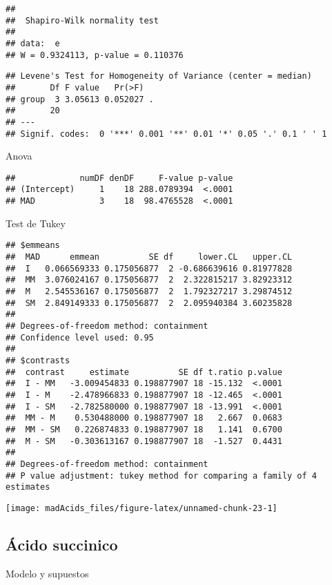 \documentclass[
]{article}
\begin{document}
\begin{verbatim}
## 
##  Shapiro-Wilk normality test
## 
## data:  e
## W = 0.9324113, p-value = 0.110376
\end{verbatim}

\begin{verbatim}
## Levene's Test for Homogeneity of Variance (center = median)
##       Df F value   Pr(>F)  
## group  3 3.05613 0.052027 .
##       20                   
## ---
## Signif. codes:  0 '***' 0.001 '**' 0.01 '*' 0.05 '.' 0.1 ' ' 1
\end{verbatim}

Anova

\begin{verbatim}
##             numDF denDF     F-value p-value
## (Intercept)     1    18 288.0789394  <.0001
## MAD             3    18  98.4765528  <.0001
\end{verbatim}

Test de Tukey

\begin{verbatim}
## $emmeans
##  MAD      emmean          SE df     lower.CL   upper.CL
##  I   0.066569333 0.175056877  2 -0.686639616 0.81977828
##  MM  3.076024167 0.175056877  2  2.322815217 3.82923312
##  M   2.545536167 0.175056877  2  1.792327217 3.29874512
##  SM  2.849149333 0.175056877  2  2.095940384 3.60235828
## 
## Degrees-of-freedom method: containment 
## Confidence level used: 0.95 
## 
## $contrasts
##  contrast     estimate          SE df t.ratio p.value
##  I - MM   -3.009454833 0.198877907 18 -15.132  <.0001
##  I - M    -2.478966833 0.198877907 18 -12.465  <.0001
##  I - SM   -2.782580000 0.198877907 18 -13.991  <.0001
##  MM - M    0.530488000 0.198877907 18   2.667  0.0683
##  MM - SM   0.226874833 0.198877907 18   1.141  0.6700
##  M - SM   -0.303613167 0.198877907 18  -1.527  0.4431
## 
## Degrees-of-freedom method: containment 
## P value adjustment: tukey method for comparing a family of 4 estimates
\end{verbatim}

\begin{center}\texttt{[image: madAcids\_files/figure-latex/unnamed-chunk-23-1]} \end{center}

\subsection{Ácido succinico}\label{uxe1cido-succinico}

Modelo y supuestos
\end{document}
